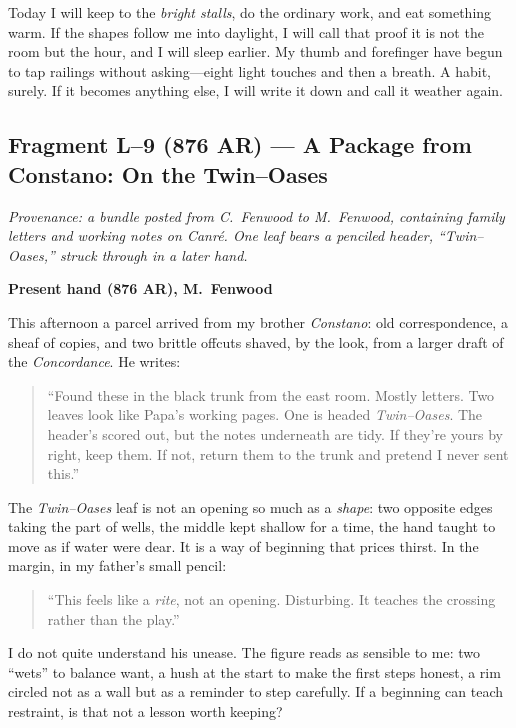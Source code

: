 \documentclass[11pt]{article}
\begin{document}
Today I will keep to the \emph{bright stalls}, do the ordinary work, and eat something warm. If the shapes follow me into daylight, I will call that proof it is not the room but the hour, and I will sleep earlier. My thumb and forefinger have begun to tap railings without asking—eight light touches and then a breath. A habit, surely. If it becomes anything else, I will write it down and call it weather again.

\subsection{Fragment L--9 (876 AR) — A Package from Constano: On the Twin--Oases}
\label{frag:l9}

\noindent\textit{Provenance: a bundle posted from C.\ Fenwood to M.\ Fenwood, containing family letters and working notes on \emph{Canr\'e}. One leaf bears a penciled header, “Twin--Oases,” struck through in a later hand.}

\medskip
\noindent\textbf{Present hand (876 AR), M.\ Fenwood}

This afternoon a parcel arrived from my brother \textit{Constano}: old correspondence, a sheaf of copies, and two brittle offcuts shaved, by the look, from a larger draft of the \emph{Concordance}. He writes:

\begin{quote}\small
“Found these in the black trunk from the east room. Mostly letters. Two leaves look like Papa’s working pages. One is headed \emph{Twin--Oases}. The header’s scored out, but the notes underneath are tidy. If they’re yours by right, keep them. If not, return them to the trunk and pretend I never sent this.”
\end{quote}

The \emph{Twin--Oases} leaf is not an opening so much as a \emph{shape}: two opposite edges taking the part of wells, the middle kept shallow for a time, the hand taught to move as if water were dear. It is a way of beginning that prices thirst. In the margin, in my father’s small pencil:

\begin{quote}\small
“This feels like a \emph{rite}, not an opening. Disturbing. It teaches the crossing rather than the play.”
\end{quote}

I do not quite understand his unease. The figure reads as sensible to me: two “wets” to balance want, a hush at the start to make the first steps honest, a rim circled not as a wall but as a reminder to step carefully. If a beginning can teach restraint, is that not a lesson worth keeping?
\end{document}
